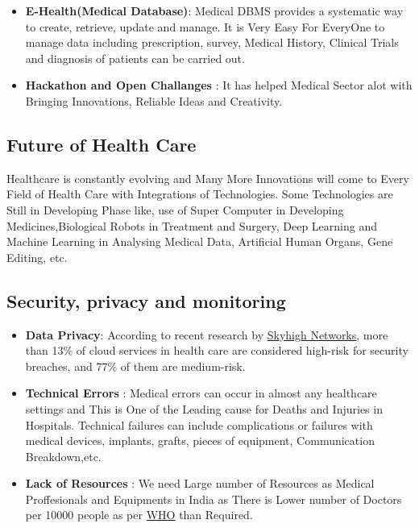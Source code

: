 \documentclass[12pt]{article}
\begin{document}
\begin{itemize}
\item[\ding{234}]\textbf{E-Health(Medical Database)}: Medical DBMS provides a systematic way to create, retrieve, update and manage. It is Very Easy For EveryOne to manage data including prescription, survey, Medical History, Clinical Trials and diagnosis of patients can be carried out.

\item[\ding{234}]\textbf{Hackathon and Open Challanges} : It has helped Medical Sector alot with Bringing Innovations, Reliable Ideas and Creativity.

\end{itemize}


\subsection{Future of Health Care}
Healthcare is constantly evolving and Many More Innovations will come to Every Field of Health Care with Integrations of Technologies. Some Technologies are Still in Developing Phase like, use of Super Computer in Developing Medicines,Biological Robots in Treatment and Surgery, Deep Learning and Machine Learning in Analysing Medical Data, Artificial Human Organs, Gene Editing, etc.

\subsection{Security, privacy and monitoring}
\begin{itemize}


\item[\ding{83}]\textbf{Data Privacy}: According to recent research by \href{http://www.forbes.com/sites/danmunro/2014/09/01/over-90-of-cloud-services-used-in-healthcare-pose-medium-to-high-security-risk/}{Skyhigh Networks}, more than 13\% of cloud services in health care are considered high-risk for security breaches, and 77\% of them are medium-risk.\\
\item[\ding{83}]\textbf{Technical Errors} : Medical errors can occur in almost any healthcare settings and This is One of the Leading cause for Deaths and Injuries in Hospitals. Technical failures can include complications or failures with medical devices, implants, grafts, pieces of equipment, Communication Breakdown,etc.\\
\item[\ding{83}]\textbf{Lack of Resources} : We need Large number of Resources as Medical Proffesionals and Equipments in India as There is Lower number of Doctors per 10000 people as per \href{https://www.who.int/data/gho/data/indicators/indicator-details/GHO/medical-doctors-(per-10-000-population)}{WHO} than Required.

\end{itemize}
\end{document}
